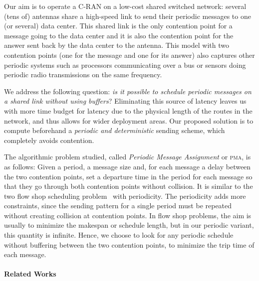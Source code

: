 \documentclass[a4paper,UKenglish,cleveref, autoref, thm-restate]{lipics-v2019}
\newcommand\pma{\textsc{pma}\xspace}
\begin{document}
Our aim is to operate a C-RAN on a low-cost shared switched network: several (tens of) antennas share a high-speed link to send their periodic messages to one (or several) data center. This shared link is the only contention point for a message going to the data center and it is also the contention point for the answer sent back by the data center to the antenna. This model with two contention points (one for the message and one for its answer) also captures other periodic systems such as processors communicating over a bus or sensors doing periodic radio transmissions on the same frequency.

We address the following question: \emph{is it possible to schedule periodic messages on a shared link without using buffers}? Eliminating this source of latency leaves us with more time budget for latency due to the physical length of the routes in the network, and thus allows for wider deployment areas. Our proposed solution is to compute beforehand a \emph{periodic and deterministic} sending scheme, which completely avoids contention.  

The algorithmic problem studied, called \emph{Periodic Message Assignment} or \pma, is as follows: Given a period, a message size and, for each message a delay between the two contention points, set a departure time in the period for each message so that they go through both contention points without collision. It is similar to the two flow shop scheduling problem~\cite{yu2004minimizing} with periodicity. The periodicity adds more constraints, since the sending pattern for a single period must be repeated without creating collision at contention points. In flow shop problems, the aim is usually to minimize the makespan or schedule length, but in our periodic variant, this quantity is infinite. Hence, we choose to look for any periodic schedule without buffering between the two contention points, to minimize the trip time of each message. 


\paragraph*{Related Works}
\end{document}

